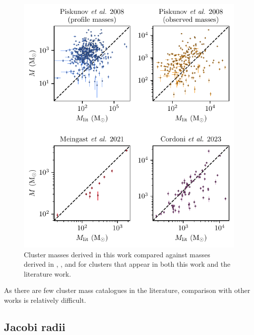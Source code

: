 \begin{figure}[t]
    \centering
    \includegraphics[width=\textwidth]{fig/c4/results_mass_comparison.pdf}
    \caption[Cluster masses derived in this work compared against masses derived in literature works.]{Cluster masses derived in this work compared against masses derived in \cite{piskunov_tidal_2008}, \cite{meingast_extended_2021}, and \cite{cordoni_photometric_binaries_2023} for clusters that appear in both this work and the literature work.}
    \label{fig:dynamics:results:mass_comparison}
\end{figure}

As there are few cluster mass catalogues in the literature, comparison with other works is relatively difficult.


\subsection{Jacobi radii}
\label{sec:dynamics:results:radii}

